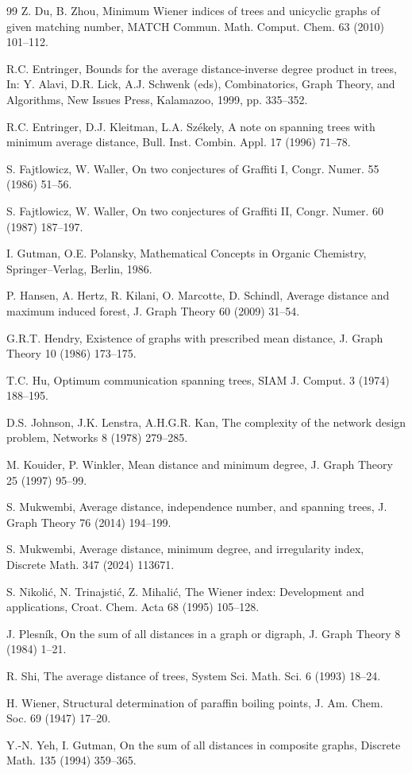 \documentclass[12pt]{article}
\begin{document}
\begin{thebibliography}{99}
Z. Du, B. Zhou, Minimum Wiener indices of trees and unicyclic graphs of given matching number, MATCH Commun. Math. Comput. Chem. 63 (2010) 101--112.



R.C. Entringer, Bounds for the average distance-inverse degree product in trees, In: Y. Alavi,
D.R. Lick, A.J. Schwenk (eds), Combinatorics, Graph Theory, and Algorithms, New Issues
Press, Kalamazoo, 1999, pp. 335--352.

R.C. Entringer, D.J. Kleitman, L.A. Sz{\' e}kely, A note on spanning trees with minimum average distance, Bull. Inst. Combin. Appl. 17 (1996) 71--78.

S. Fajtlowicz, W. Waller, On two conjectures of Graffiti I, Congr. Numer. 55 (1986) 51--56.

S. Fajtlowicz, W. Waller, On two conjectures of Graffiti II, Congr. Numer. 60 (1987) 187--197.


I. Gutman, O.E. Polansky,
Mathematical Concepts in Organic Chemistry, Springer--Verlag, Berlin,
1986.



P. Hansen, A. Hertz, R. Kilani, O. Marcotte, D. Schindl, Average distance and maximum induced forest, J. Graph Theory 60 (2009) 31--54.

G.R.T. Hendry, Existence of graphs with prescribed mean distance, J. Graph Theory 10 (1986)
173--175.

T.C. Hu,
Optimum communication spanning trees, SIAM J. Comput. 3 (1974) 188--195.

D.S. Johnson, J.K. Lenstra, A.H.G.R. Kan, The complexity of the network design problem, Networks 8 (1978) 279--285.

M. Kouider, P. Winkler, Mean distance and minimum degree, J. Graph Theory 25 (1997) 95--99.

S. Mukwembi, Average distance, independence number, and spanning trees,
J. Graph Theory 76 (2014) 194--199.

S. Mukwembi, Average distance, minimum degree, and irregularity index, Discrete Math. 347 (2024) 113671.

S. Nikoli\'{c}, N. Trinajsti\'{c}, Z. Mihali\'{c}, The Wiener index:
Development and applications, Croat. Chem. Acta 68 (1995) 105--128.


J. Plesn\'{i}k, On the sum of all distances in a graph or digraph, J. Graph Theory 8 (1984) 1--21.

R. Shi, The average distance of trees, System Sci. Math. Sci. 6 (1993) 18--24.



H. Wiener, Structural determination of paraffin boiling
points, J. Am. Chem. Soc. 69 (1947)  17--20.

Y.-N. Yeh, I. Gutman, On the sum of all distances in composite graphs, Discrete Math. 135
(1994) 359--365.


\end{thebibliography}
\end{document}
